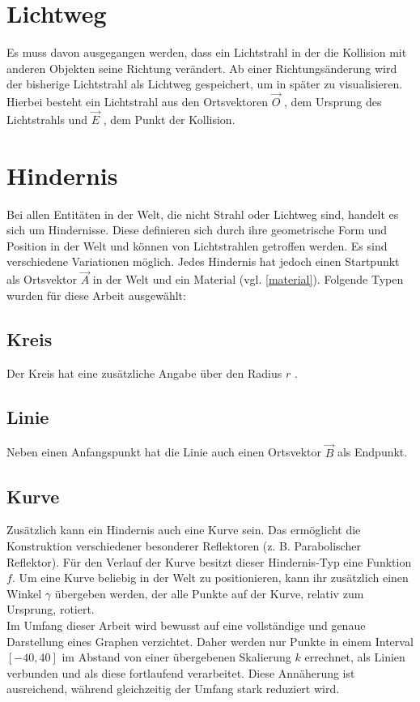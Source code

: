 \section{Lichtweg}
Es muss davon ausgegangen werden, dass ein Lichtstrahl in der 
die Kollision mit anderen Objekten seine Richtung verändert. 
Ab einer Richtungsänderung wird der bisherige Lichtstrahl als Lichtweg  
gespeichert, um in später zu visualisieren.
Hierbei besteht ein Lichtstrahl aus den Ortsvektoren $ \vec{O} $ , dem 
Ursprung des Lichtstrahls und $ \vec{E} $ , dem Punkt der Kollision.

\section{Hindernis}
Bei allen Entitäten in der Welt, die nicht Strahl oder Lichtweg sind, 
handelt es sich um Hindernisse. 
Diese definieren sich durch ihre geometrische Form und Position in der Welt 
und können von Lichtstrahlen getroffen werden.
Es sind verschiedene Variationen möglich. Jedes Hindernis  
hat jedoch einen Startpunkt als Ortsvektor $ \vec{A} $  in der Welt
und ein Material  (vgl. \ref{material}). 
Folgende Typen wurden für diese Arbeit ausgewählt: 

\subsection{Kreis}
Der Kreis  hat eine zusätzliche Angabe über den Radius $ r $ .

\subsection{Linie}
Neben einen Anfangspunkt hat die Linie  auch einen Ortsvektor $ \vec{B} $ als Endpunkt. 

\subsection{Kurve}
Zusätzlich kann ein Hindernis auch eine Kurve  sein. 
Das ermöglicht die Konstruktion verschiedener besonderer Reflektoren (z. B. Parabolischer Reflektor).
Für den Verlauf der Kurve besitzt dieser Hindernis-Typ eine Funktion $ f $. 
Um eine Kurve beliebig in der Welt zu positionieren, kann 
ihr zusätzlich einen Winkel $ \gamma $  übergeben werden, 
der alle Punkte auf der Kurve, relativ zum Ursprung, rotiert. \\
Im Umfang dieser Arbeit wird bewusst auf eine vollständige und genaue Darstellung eines Graphen verzichtet. 
Daher werden nur Punkte in einem Interval $ [-40, 40] $ im Abstand von einer übergebenen Skalierung $ k $  errechnet, 
als Linien verbunden und als diese fortlaufend verarbeitet. 
Diese Annäherung ist ausreichend, während gleichzeitig der Umfang stark reduziert wird.


